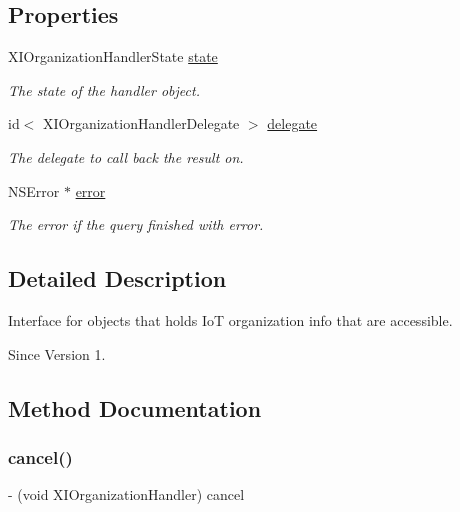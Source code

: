 \subsection*{Properties}
\begin{DoxyCompactItemize}
\item 
X\+I\+Organization\+Handler\+State \hyperlink{protocol_x_i_organization_handler_01-p_aaab2f6fa3c8134fe4d726ab87538fdd4}{state}
\begin{DoxyCompactList}\small\item\em The state of the handler object. \end{DoxyCompactList}\item 
id$<$ X\+I\+Organization\+Handler\+Delegate $>$ \hyperlink{protocol_x_i_organization_handler_01-p_a2a1851bcf9cbac6a5a8f2f18f566fd0c}{delegate}
\begin{DoxyCompactList}\small\item\em The delegate to call back the result on. \end{DoxyCompactList}\item 
N\+S\+Error $\ast$ \hyperlink{protocol_x_i_organization_handler_01-p_a10736d88a59d4ad85fedcdf041888401}{error}
\begin{DoxyCompactList}\small\item\em The error if the query finished with error. \end{DoxyCompactList}\end{DoxyCompactItemize}


\subsection{Detailed Description}
Interface for objects that holds IoT organization info that are accessible. 

\begin{DoxySince}{Since}
Version 1. 
\end{DoxySince}


\subsection{Method Documentation}
\hypertarget{protocol_x_i_organization_handler_01-p_af3b06f8c5b80ad208741cee353356fbc}{}\label{protocol_x_i_organization_handler_01-p_af3b06f8c5b80ad208741cee353356fbc} 
\subsubsection{\texorpdfstring{cancel()}{cancel()}}
{\footnotesize\ttfamily -\/ (void X\+I\+Organization\+Handler) cancel \begin{DoxyParamCaption}{ }\end{DoxyParamCaption}}




